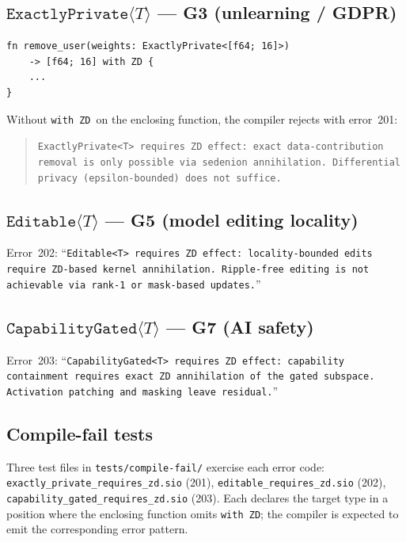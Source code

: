 \documentclass{article}
\newcommand{\ExactlyPrivate}[1]{\texttt{ExactlyPrivate}\langle #1 \rangle}
\newcommand{\Editable}[1]{\texttt{Editable}\langle #1 \rangle}
\newcommand{\CapabilityGated}[1]{\texttt{CapabilityGated}\langle #1 \rangle}
\newcommand{\withZD}{\texttt{with ZD}}
\begin{document}
\subsection{$\ExactlyPrivate{T}$ — G3 (unlearning / GDPR)}

\begin{lstlisting}[basicstyle=\ttfamily\small]
fn remove_user(weights: ExactlyPrivate<[f64; 16]>)
    -> [f64; 16] with ZD {
    ...
}
\end{lstlisting}

Without \withZD~on the enclosing function, the compiler rejects with
error~201:

\begin{quote}\small
\texttt{ExactlyPrivate<T> requires ZD effect: exact data-contribution
removal is only possible via sedenion annihilation. Differential privacy
(epsilon-bounded) does not suffice.}
\end{quote}

\subsection{$\Editable{T}$ — G5 (model editing locality)}

Error~202: ``\texttt{Editable<T> requires ZD effect: locality-bounded
edits require ZD-based kernel annihilation.  Ripple-free editing is
not achievable via rank-1 or mask-based updates.}''

\subsection{$\CapabilityGated{T}$ — G7 (AI safety)}

Error~203: ``\texttt{CapabilityGated<T> requires ZD effect: capability
containment requires exact ZD annihilation of the gated subspace.
Activation patching and masking leave residual.}''

\subsection{Compile-fail tests}

Three test files in \texttt{tests/compile-fail/} exercise each error code:
\texttt{exactly\_private\_requires\_zd.sio} (201),
\texttt{editable\_requires\_zd.sio} (202),
\texttt{capability\_gated\_requires\_zd.sio} (203).  Each declares the
target type in a position where the enclosing function omits
\withZD; the compiler is expected to emit the corresponding error pattern.
\end{document}
